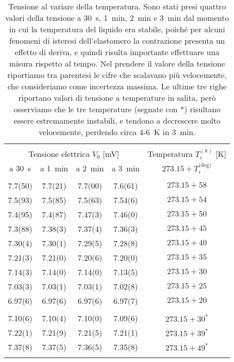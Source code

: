 \begin{table}
    \footnotesize
    \centering
    \caption{Tensione al variare della temperatura. Sono stati presi quattro valori della tensione a 30~s, 1~min, 2~min e 3~min dal momento in cui la temperatura del liquido era stabile, poiché per alcuni fenomeni di isteresi dell'elastomero la contrazione presenta un effetto di deriva, e quindi risulta importante effettuare una misura rispetto al tempo. Nel prendere il valore della tensione riportiamo tra parentesi le cifre che scalavano più velocemente, che consideriamo come incertezza massima. Le ultime tre righe riportano valori di tensione a temperature in salita, però osserviamo che le tre temperature (segnate con *) risultano essere estremamente instabili, e tendono a decrescere molto velocemente, perdendo circa 4-6~K in 3~min.}
    \label{table:p2}
    \begin{tabular}{ccccc}
        \hline\hline\\[-1.5ex]
        \multicolumn{4}{c}{Tensione elettrica $V_0$ [mV]} & Temperatura $T_i^{(k)}$ [K] \\[+0.5ex]
        a 30~s  & a 1~min & a 2~min & a 3~min             & $273.15+T_i^{\text{(deg)}}$ \\[+0.5ex] \hline \\[-1.5ex]
        7.7(50) & 7.7(21) & 7.7(00) & 7.6(61)             & $273.15+58$                 \\[+0.5ex]
        7.5(93) & 7.5(85) & 7.5(63) & 7.54(6)             & $273.15+54$                 \\[+0.5ex]
        7.4(95) & 7.4(87) & 7.47(3) & 7.46(0)             & $273.15+50$                 \\[+0.5ex]
        7.3(88) & 7.38(3) & 7.37(4) & 7.36(3)             & $273.15+45$                 \\[+0.5ex]
        7.30(4) & 7.30(1) & 7.29(5) & 7.28(8)             & $273.15+40$                 \\[+0.5ex]
        7.21(3) & 7.21(0) & 7.20(6) & 7.20(0)             & $273.15+35$                 \\[+0.5ex]
        7.14(3) & 7.14(0) & 7.14(0) & 7.13(5)             & $273.15+30$                 \\[+0.5ex]
        7.03(3) & 7.03(1) & 7.03(1) & 7.02(8)             & $273.15+25$                 \\[+0.5ex]
        6.97(6) & 6.97(6) & 6.97(6) & 6.97(7)             & $273.15+20$                 \\[+0.5ex] \hline \\[-1.5ex]
        7.10(6) & 7.10(4) & 7.10(0) & 7.09(6)             & $273.15+30^*$               \\[+0.5ex]
        7.22(1) & 7.21(9) & 7.21(5) & 7.21(1)             & $273.15+39^*$               \\[+0.5ex]
        7.37(8) & 7.37(5) & 7.36(5) & 7.35(8)             & $273.15+49^*$               \\[+0.5ex] \hline \\[-1.5ex]
    \end{tabular}
\end{table}

